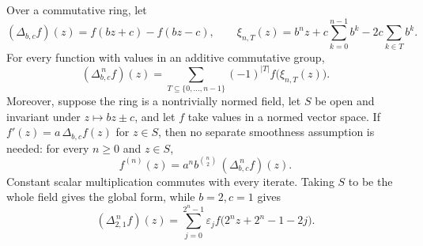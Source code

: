 \documentclass[11pt]{article}
\theoremstyle{definition}
\theoremstyle{remark}
\newcommand{\eps}{\varepsilon}
\begin{document}
\begin{proposition}
\label{p1:prop:affine-difference-formal}
Over a commutative ring, let
\[
 (\Delta_{b,c}f)(z)=f(bz+c)-f(bz-c),\qquad
 \xi_{n,T}(z)=b^nz+c\sum_{k=0}^{n-1}b^k-2c\sum_{k\in T}b^k .
\]
For every function with values in an additive commutative group,
\begin{equation}
 (\Delta_{b,c}^{\,n}f)(z)
 =\sum_{T\subseteq\{0,\ldots,n-1\}}(-1)^{|T|}f\bigl(\xi_{n,T}(z)\bigr).
 \label{p1:eq:affine-cube-formal}
\end{equation}
Moreover, suppose the ring is a nontrivially normed field, let \(S\) be open and invariant
under \(z\mapsto bz\pm c\), and let \(f\) take values in a normed vector space.  If
\(f'(z)=a\,\Delta_{b,c}f(z)\) for \(z\in S\), then no separate smoothness assumption is
needed: for every \(n\geq0\) and \(z\in S\),
\begin{equation}
 f^{(n)}(z)=a^n b^{\binom n2}\,(\Delta_{b,c}^{\,n}f)(z).
 \label{p1:eq:affine-derivative-formal}
\end{equation}
Constant scalar multiplication commutes with every iterate.  Taking \(S\) to be the
whole field gives the global form, while \(b=2,c=1\) gives
\begin{equation}
 (\Delta_{2,1}^{\,n}f)(z)
 =\sum_{j=0}^{2^n-1}\eps_j f\bigl(2^nz+2^n-1-2j\bigr).
 \label{p1:eq:affine-dyadic-formal}
\end{equation}
\end{proposition}
\end{document}
